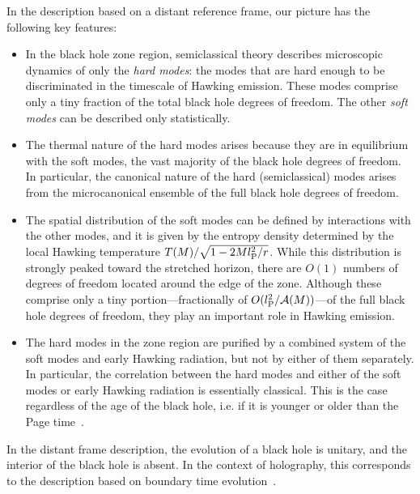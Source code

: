\documentclass[12pt]{article}
\begin{document}
In the description based on a distant reference frame, our picture 
has the following key features:
%
\begin{itemize}
%
\item
In the black hole zone region, semiclassical theory describes 
microscopic dynamics of only the \emph{hard modes}: the modes that 
are hard enough to be discriminated in the timescale of Hawking 
emission.  These modes comprise only a tiny fraction of the 
total black hole degrees of freedom.  The other \emph{soft modes} can 
be described only statistically.
%
\item
The thermal nature of the hard modes arises because they are in 
equilibrium with the soft modes, the vast majority of the black 
hole degrees of freedom.  In particular, the canonical nature 
of the hard (semiclassical) modes arises from the microcanonical 
ensemble of the full black hole degrees of freedom.
%
\item
The spatial distribution of the soft modes can be defined 
by interactions with the other modes, and it is given by the 
entropy density determined by the local Hawking temperature 
$T(M)/\sqrt{1-2Ml_{\rm P}^2/r}$.  While this distribution is 
strongly peaked toward the stretched horizon, there are $O(1)$ 
numbers of degrees of freedom located around the edge of the zone. 
Although these comprise only a tiny portion---fractionally of 
$O(l_{\rm P}^2/{\cal A}(M))$---of the full black hole degrees 
of freedom, they play an important role in Hawking emission.
%
\item
The hard modes in the zone region are purified by a combined system 
of the soft modes and early Hawking radiation, but not by either 
of them separately.  In particular, the correlation between the 
hard modes and either of the soft modes or early Hawking radiation 
is essentially classical.  This is the case regardless of the age 
of the black hole, i.e. if it is younger or older than the Page 
time~\cite{Page:1993wv}.
%
\end{itemize}
%
In the distant frame description, the evolution of a black hole is 
unitary, and the interior of the black hole is absent.  In the context 
of holography, this corresponds to the description based on boundary 
time evolution~\cite{Nomura:2018kji}.
\end{document}
